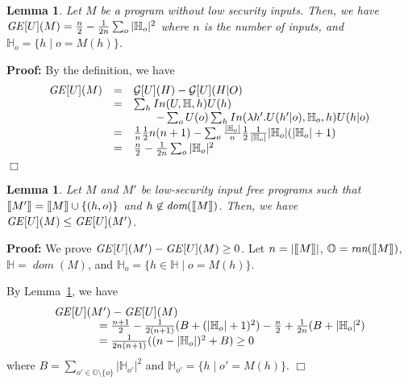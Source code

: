 \documentclass{llncs}
\newtheorem{lemma}[theorem]{Lemma}
\newenvironment{proof}{\noindent\rm{\bf Proof:}}{\hbox{$\Box$}\vspace*{0.2\baselineskip}}
\newcommand{\aset}[1]{\{{#1}\}}
\newcommand{\sembrack}[1]{[\hspace*{-1.2pt}[#1]\hspace*{-1.2pt}]}
\newcommand{\dom}{\mathop\textit{dom}\nolimits}
\newcommand{\ran}{\mathop\textit{ran}\nolimits}
\begin{document}
\begin{lemma}
  Let $M$ be a program without low security inputs.  Then, we have
  ${\it GE}[U](M)=\frac{n}{2}-\frac{1}{2n}\sum_o|\mathbb{H}_o|^2$
  where $n$ is the number of inputs, and $\mathbb{H}_o=\aset{h\mid
    o=M(h)}$.
\label{lem:geu}
\end{lemma}
\begin{proof}
By the definition, we have
\[
\begin{array}{rcl}
  {\it GE}[U](M)&=&\mathcal{G}[U](H)-\mathcal{G}[U](H|O)\\
  &=&\sum_h In(U,\mathbb{H},h)U(h)\\
&&\qquad-\sum_o U(o)\sum_h In(\lambda h'.U(h'|o),\mathbb{H}_o,h) U(h|o)\\
  &=&\frac{1}{n}\frac{1}{2}n(n+1)-\sum_o \frac{|\mathbb{H}_o|}{n}\frac{1}{2}\frac{1}{|\mathbb{H}_o|}|\mathbb{H}_o|(|\mathbb{H}_o|+1)\\
  &=&\frac{n}{2}-\frac{1}{2n}\sum_o |\mathbb{H}_o|^2
\end{array}
\]
\end{proof}

\begin{lemma}
  Let $M$ and $M'$ be low-security input free programs such that
  $\sembrack{M'}=\sembrack{M}\cup\aset{(h,o)}$ and
  $h\not\in\dom(\sembrack{M})$.  Then, we have ${\it GE}[U](M)\le{\it
  GE}[U](M')$.
\label{lem:gemono2}
\end{lemma}
\begin{proof}
  We prove ${\it GE}[U](M')-{\it GE}[U](M)\ge 0$.  Let $n =
  |\sembrack{M}|$, $\mathbb{O}=\ran(\sembrack{M})$, $\mathbb{H} =
  \dom(M)$, and $\mathbb{H}_o = \aset{h\in\mathbb{H}\mid o= M(h)}$.

  By Lemma~\ref{lem:geu}, we have
\[
\begin{array}{l}
  {\it GE}[U](M')-{\it GE}[U](M)\\
\hspace{4em}=\frac{n+1}{2}-\frac{1}{2(n+1)}(B + (|\mathbb{H}_{o}|+1)^2)
  -\frac{n}{2}+\frac{1}{2n}(B+ |\mathbb{H}_{o}|^2)\\
\hspace{4em}  =\frac{1}{2n(n+1)}((n-|\mathbb{H}_{o}|)^2+B)\ge 0
\end{array}
\]
where $B=\sum_{o'\in \mathbb O\setminus \aset{o}} |\mathbb{H}_{o'}|^2$
 and $\mathbb{H}_{o'}=\aset{h\mid o'=M(h)}$.
\end{proof}
\end{document}
